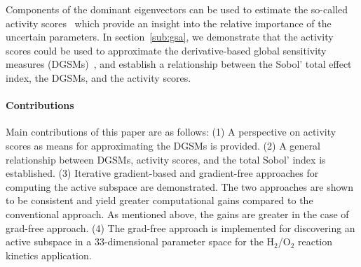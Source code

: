 Components of the dominant eigenvectors can be used to estimate the so-called
activity scores~\cite{Diaz:2016,Constantine:2017} which provide an insight into
the relative importance of the uncertain parameters. In section~\ref{sub:gsa},
we demonstrate that the activity scores could be used to approximate the
derivative-based global sensitivity measures (DGSMs)~\cite{Sobol:2009}, and
establish a relationship between the Sobol' total effect index, the DGSMs, and
the activity scores. 


\paragraph{Contributions}
Main contributions of this paper are as follows: (1) A perspective on activity
scores as means for approximating the DGSMs is provided. (2) A general
relationship between DGSMs, activity scores, and the total Sobol' index is
established. (3) Iterative gradient-based and gradient-free approaches for
computing the active subspace are demonstrated. The two approaches are shown to
be consistent and yield greater computational gains compared to the
conventional approach. As mentioned above, the gains are greater in the case of
grad-free approach. (4) The grad-free approach is implemented for discovering
an active subspace in a 33-dimensional parameter space for the H$_2$/O$_2$
reaction kinetics application. 
 

